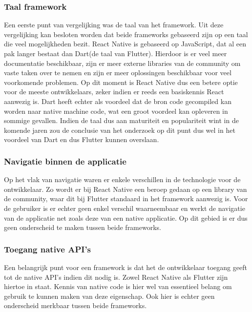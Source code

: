 \subsubsection{Taal framework}

Een eerste punt van vergelijking was de taal van het framework. Uit deze vergelijking kan besloten worden dat beide frameworks gebaseerd zijn op een taal die veel mogelijkheden bezit. React Native is gebaseerd op JavaScript, dat al een pak langer bestaat dan Dart(de taal van Flutter). Hierdoor is er veel meer documentatie beschikbaar, zijn er meer externe libraries van de community om vaste taken over te nemen en zijn er meer oplossingen beschikbaar voor veel voorkomende problemen. Op dit moment is React Native dus een betere optie voor de meeste ontwikkelaars, zeker indien er reeds een basiskennis React aanwezig is. Dart heeft echter als voordeel dat de bron code gecompiled kan worden naar native machine code, wat een groot voordeel kan opleveren in sommige gevallen. Indien de taal dus aan maturiteit en populariteit wint in de komende jaren zou de conclusie van het onderzoek op dit punt dus wel in het voordeel van Dart en dus Flutter kunnen overslaan.

\subsubsection{Navigatie binnen de applicatie}

Op het vlak van navigatie waren er enkele verschillen in de technologie voor de ontwikkelaar. Zo wordt er bij React Native een beroep gedaan op een library van de community, waar dit bij Flutter standaard in het framework aanwezig is. Voor de gebruiker is er echter geen enkel verschil waarneembaar en werkt de navigatie van de applicatie net zoals deze van een native applicatie. Op dit gebied is er dus geen onderscheid te maken tussen beide frameworks.

\subsubsection{Toegang native API's}

Een belangrijk punt voor een framework is dat het de ontwikkelaar toegang geeft tot de native API's indien dit nodig is. Zowel React Native als Flutter zijn hiertoe in staat. Kennis van native code is hier wel van essentieel belang om gebruik te kunnen maken van deze eigenschap. Ook hier is echter geen onderscheid merkbaar tussen beide frameworks.

